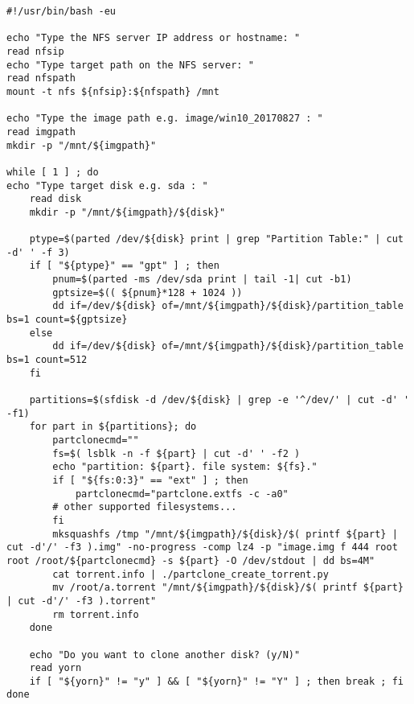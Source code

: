 \begin{minipage}{\textwidth}
\begin{lstlisting}[caption= The Shell Script of BitAtom]
#!/usr/bin/bash -eu

echo "Type the NFS server IP address or hostname: "
read nfsip
echo "Type target path on the NFS server: "
read nfspath
mount -t nfs ${nfsip}:${nfspath} /mnt

echo "Type the image path e.g. image/win10_20170827 : "
read imgpath
mkdir -p "/mnt/${imgpath}"

while [ 1 ] ; do
echo "Type target disk e.g. sda : "
	read disk
	mkdir -p "/mnt/${imgpath}/${disk}"

	ptype=$(parted /dev/${disk} print | grep "Partition Table:" | cut -d' ' -f 3)
	if [ "${ptype}" == "gpt" ] ; then
		pnum=$(parted -ms /dev/sda print | tail -1| cut -b1)
		gptsize=$(( ${pnum}*128 + 1024 ))
		dd if=/dev/${disk} of=/mnt/${imgpath}/${disk}/partition_table bs=1 count=${gptsize}
	else
		dd if=/dev/${disk} of=/mnt/${imgpath}/${disk}/partition_table bs=1 count=512
	fi

	partitions=$(sfdisk -d /dev/${disk} | grep -e '^/dev/' | cut -d' ' -f1)
	for part in ${partitions}; do
		partclonecmd=""
		fs=$( lsblk -n -f ${part} | cut -d' ' -f2 )
		echo "partition: ${part}. file system: ${fs}."
		if [ "${fs:0:3}" == "ext" ] ; then
			partclonecmd="partclone.extfs -c -a0" 
		# other supported filesystems...
		fi
		mksquashfs /tmp "/mnt/${imgpath}/${disk}/$( printf ${part} | cut -d'/' -f3 ).img" -no-progress -comp lz4 -p "image.img f 444 root root /root/${partclonecmd} -s ${part} -O /dev/stdout | dd bs=4M"
		cat torrent.info | ./partclone_create_torrent.py
		mv /root/a.torrent "/mnt/${imgpath}/${disk}/$( printf ${part} | cut -d'/' -f3 ).torrent"
		rm torrent.info
	done

	echo "Do you want to clone another disk? (y/N)"
	read yorn
	if [ "${yorn}" != "y" ] && [ "${yorn}" != "Y" ] ; then break ; fi
done
\end{lstlisting}
\end{minipage}

